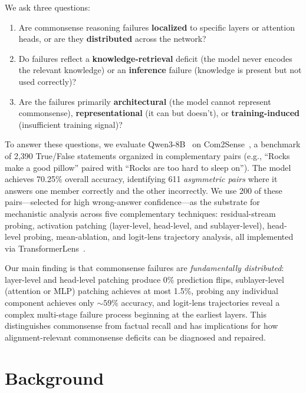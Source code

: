 \documentclass{article}
\begin{document}
We ask three questions:
\begin{enumerate}
    \item Are commonsense reasoning failures \textbf{localized} to specific layers or attention heads, or are they \textbf{distributed} across the network?
    \item Do failures reflect a \textbf{knowledge-retrieval} deficit (the model never encodes the relevant knowledge) or an \textbf{inference} failure (knowledge is present but not used correctly)?
    \item Are the failures primarily \textbf{architectural} (the model cannot represent commonsense), \textbf{representational} (it can but doesn't), or \textbf{training-induced} (insufficient training signal)?
\end{enumerate}

To answer these questions, we evaluate Qwen3-8B~\citep{qwen3} on Com2Sense~\citep{singh2021com2sense}, a benchmark of 2,390 True/False statements organized in complementary pairs (e.g., ``Rocks make a good pillow'' paired with ``Rocks are too hard to sleep on'').
The model achieves 70.25\% overall accuracy, identifying 611 \emph{asymmetric pairs} where it answers one member correctly and the other incorrectly.
We use 200 of these pairs---selected for high wrong-answer confidence---as the substrate for mechanistic analysis across five complementary techniques: residual-stream probing, activation patching (layer-level, head-level, and sublayer-level), head-level probing, mean-ablation, and logit-lens trajectory analysis, all implemented via TransformerLens~\citep{nanda2022transformerlens}.

Our main finding is that commonsense failures are \emph{fundamentally distributed}: layer-level and head-level patching produce 0\% prediction flips, sublayer-level (attention or MLP) patching achieves at most 1.5\%, probing any individual component achieves only ${\sim}59$\% accuracy, and logit-lens trajectories reveal a complex multi-stage failure process beginning at the earliest layers.
This distinguishes commonsense from factual recall and has implications for how alignment-relevant commonsense deficits can be diagnosed and repaired.

\section{Background}
\label{sec:background}
\end{document}
